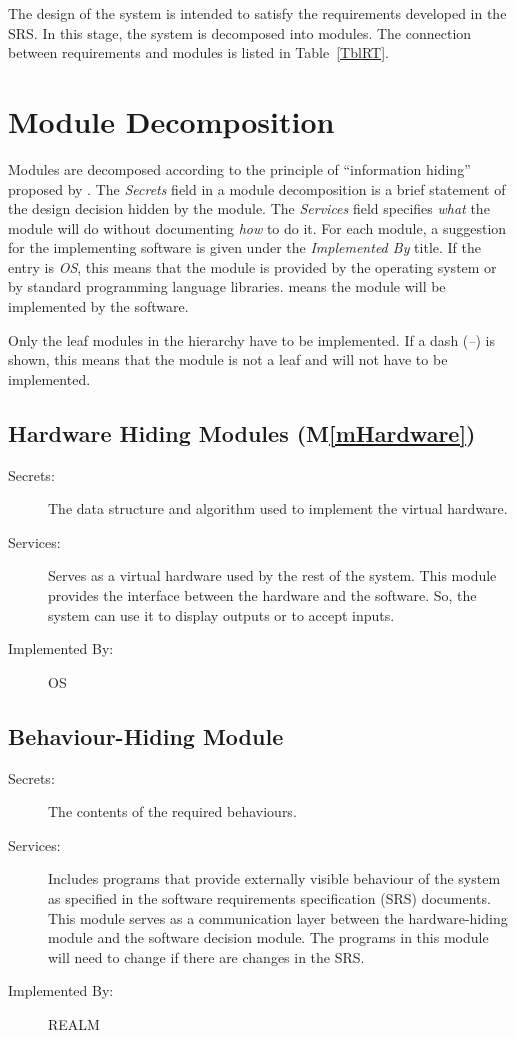 \documentclass[12pt, titlepage]{article}
\newcommand{\mref}[1]{M\ref{#1}}
\begin{document}
The design of the system is intended to satisfy the requirements developed in
the SRS. In this stage, the system is decomposed into modules. The connection
between requirements and modules is listed in Table~\ref{TblRT}.


\section{Module Decomposition} \label{SecMD}

Modules are decomposed according to the principle of ``information hiding''
proposed by \citet{ParnasEtAl1984}. The \emph{Secrets} field in a module
decomposition is a brief statement of the design decision hidden by the
module. The \emph{Services} field specifies \emph{what} the module will do
without documenting \emph{how} to do it. For each module, a suggestion for the
implementing software is given under the \emph{Implemented By} title. If the
entry is \emph{OS}, this means that the module is provided by the operating
system or by standard programming language libraries.  \emph{\progname{}} means the
module will be implemented by the \progname{} software.

Only the leaf modules in the hierarchy have to be implemented. If a dash
(\emph{--}) is shown, this means that the module is not a leaf and will not have
to be implemented.

\subsection{Hardware Hiding Modules (\mref{mHardware})}

\begin{description}
\item[Secrets:]The data structure and algorithm used to implement the virtual
  hardware.
\item[Services:]Serves as a virtual hardware used by the rest of the
  system. This module provides the interface between the hardware and the
  software. So, the system can use it to display outputs or to accept inputs.
\item[Implemented By:] OS
\end{description}

\subsection{Behaviour-Hiding Module}

\begin{description}
\item[Secrets:]The contents of the required behaviours.
\item[Services:]Includes programs that provide externally visible behaviour of
  the system as specified in the software requirements specification (SRS)
  documents. This module serves as a communication layer between the
  hardware-hiding module and the software decision module. The programs in this
  module will need to change if there are changes in the SRS.
\item[Implemented By:] REALM
\end{description}
\end{document}
